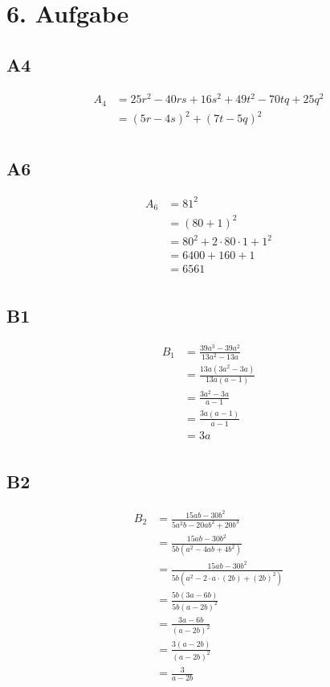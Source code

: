 \documentclass[]{article}
\begin{document}
\section*{6. Aufgabe}

\subsection*{A4}
\begin{align*}
	&& A_4 &= 25r^2-40rs+16s^2+49t^2-70tq+25q^2 &&\\
	&& &= (5r-4s)^2+(7t-5q)^2 &&\\
\end{align*}
\subsection*{A6}
\begin{align*}
	&& A_6 &= 81^2 &&\\
	&&  &= (80+1)^2 &&\\
	&&  &= 80^2 + 2 \cdot 80 \cdot 1 + 1^2 &&\\
	&&  &= 6400 + 160 + 1 &&\\
	&&  &= 6561 &&\\
\end{align*}


\subsection*{B1}
\begin{align*}
	&& B_1 &= \frac{39a^3-39a^2}{13a^2-13a} &&\\
	&& &= \frac{13a(3a^2-3a)}{13a(a-1)} &&\\
	&& &= \frac{3a^2-3a}{a-1} &&\\
	&& &= \frac{3a(a-1)}{a-1} &&\\
	&& &= 3a &&\\
\end{align*}

\subsection*{B2}
\begin{align*}
	&& B_2 &= \frac{15ab-30b^2}{5a^2b-20ab^2+20b^3} &&\\
	&& &= \frac{15ab-30b^2}{5b(a^2-4ab+4b^2)} &&\\
	&& &= \frac{15ab-30b^2}{5b(a^2-2\cdot a \cdot (2b)+(2b)^2)} &&\\
	&& &= \frac{5b(3a-6b)}{5b(a-2b)^2} &&\\
	&& &= \frac{3a-6b}{(a-2b)^2} &&\\
	&& &= \frac{3(a-2b)}{(a-2b)^2} &&\\
	&& &= \frac{3}{a-2b} &&\\
\end{align*}
\end{document}
